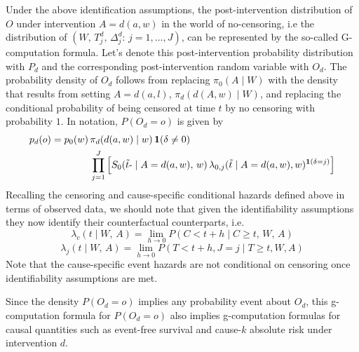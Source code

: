 \documentclass{report}
\newcommand{\1}{\ensuremath{\mathbf{1}}}
\renewcommand{\t}{\ensuremath{\Tilde{t}}}
\newcommand{\g}{\ensuremath{\pi}}
\renewcommand{\L}{\ensuremath{W}}
\renewcommand{\l}{\ensuremath{w}}
\begin{document}
Under the above identification assumptions, the post-intervention distribution of \(O\) under intervention \(A=d(a, \l)\) in the world of no-censoring, i.e the distribution of \((\L,\, T^d_j,\, \Delta^d_j :\, j = 1, \dots, J)\), can be represented by the so-called G-computation formula. Let’s denote this post-intervention probability distribution with \(P_{d}\) and the corresponding post-intervention random variable with \(O_d\). The probability density of \(O_d\) follows from replacing \(\g_0(A \mid \L)\) with the density that results from setting \(A = d(a, l)\), \(\g_d(d(A, \l) \mid \L)\), and replacing the conditional probability of being censored at time \(t\) by no censoring with probability \(1\). In notation, \(P(O_d = o)\) is given by
\begin{align*}
p_{d}(o) = p_{0}(\l) \, &\g_d(d(a, \l) \mid \l) \, \1(\delta \neq 0)\\
&\prod_{j=1}^{J} \left[S_{0}(\t\text{-} \mid A = d(a, \l),\, \l) \, \lambda_{0,j}(\t \mid A = d(a, \l), \l)^{\1(\delta = j)} \right]
\end{align*}
Recalling the censoring and cause-specific conditional hazards defined above in terms of observed data, we should note that given the identifiability assumptions they now identify their counterfactual counterparts, i.e. 
\[\lambda_{c}(t \mid W,\, A) = \lim_{h \to 0}P(C < t + h \mid C \geq t,\, W,\, A)\]
\[\lambda_{j}(t \mid W,\, A)= \lim_{h \to 0}P(T < t+h, J=j \mid T \geq t, W, A)\]
Note that the cause-specific event hazards are not conditional on censoring once identifiability assumptions are met.

Since the density \(P(O_d=o)\) implies any probability event about \(O_d\), this g-computation formula for \(P(O_d=o)\) also implies g-computation formulas for causal quantities such as event-free survival and cause-\(k\) absolute risk under intervention \(d\). 

\newpage

\end{document}
